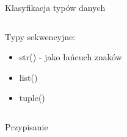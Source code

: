 \begin{frame}{Klasyfikacja typów danych}
\begin{columns}
\begin{column}{0.5\textwidth}
\begin{itemize}
            \end{itemize}
            Typy sekwencyjne:
            \begin{itemize}
                \item str() - jako łańcuch znaków \\
                \item list() \\
                \item tuple() \\
            \end{itemize}
        \end{column}
    \end{columns}
\end{frame}

\begin{frame}{Przypisanie}
    
\end{frame}
